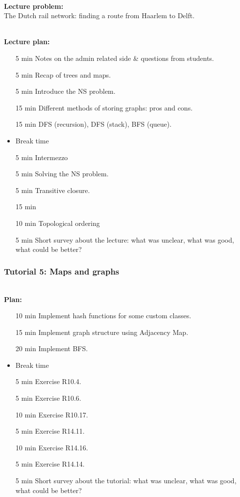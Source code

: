 \hfill\\
\textbf{Lecture problem:}\\
The Dutch rail network: finding a route from Haarlem to Delft.

\hfill\\
\textbf{Lecture plan:}\\
\begin{itemize}
	\item[5 min] Notes on the admin related side \& questions from students.
	\item[5 min] Recap of trees and maps.
	\item[5 min] Introduce the NS problem.
	\item[15 min] Different methods of storing graphs: pros and cons.
	\item[15 min] DFS (recursion), DFS (stack), BFS (queue).
	\item Break time
	\item[5 min] Intermezzo
	\item[5 min] Solving the NS problem.
	\item[5 min] Transitive closure.
	\item[15 min] 
	\item[10 min] Topological ordering
	\item[5 min] Short survey about the lecture: what was unclear, what was good, what could be better?
\end{itemize}

\newpage
\subsubsection{Tutorial 5: Maps and graphs}
\label{ssub:tutorial_5}

\hfill\\
\textbf{Plan:}\\
\begin{itemize}
	\item[10 min] Implement hash functions for some custom classes.
	\item[15 min] Implement graph structure using Adjacency Map.
	\item[20 min] Implement BFS.
	\item Break time
	\item[5 min] Exercise R10.4.
	\item[5 min] Exercise R10.6.
	\item[10 min] Exercise R10.17.
	\item[5 min] Exercise R14.11.
	\item[10 min] Exercise R14.16.
	\item[5 min] Exercise R14.14.
	\item[5 min] Short survey about the tutorial: what was unclear, what was good, what could be better?
\end{itemize}


